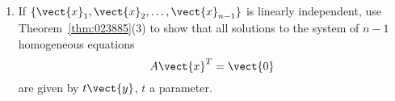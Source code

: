 \begin{multicols}{2}
\begin{ex}
\begin{enumerate}[label={\alph*.}]
\item If $\{\vect{x}_{1}, \vect{x}_{2}, \dots , \vect{x}_{n-1}\}$ is linearly independent, use Theorem~\ref{thm:023885}(3) to show that all solutions to the system of $n - 1$ homogeneous equations
\begin{equation*}
A\vect{x}^T = \vect{0}
\end{equation*}
are given by $t\vect{y}$, $t$ a parameter.

\end{enumerate}
\end{ex}
\end{multicols}
